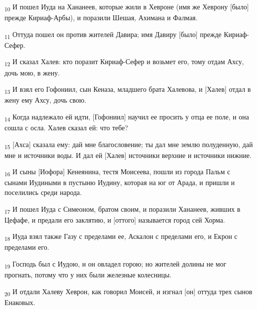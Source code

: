 \begin{tcolorbox}
\textsubscript{10} И пошел Иуда на Хананеев, которые жили в Хевроне (имя же Хеврону [было] прежде Кириаф-Арбы), и поразили Шешая, Ахимана и Фалмая.
\end{tcolorbox}
\begin{tcolorbox}
\textsubscript{11} Оттуда пошел он против жителей Давира; имя Давиру [было] прежде Кириаф-Сефер.
\end{tcolorbox}
\begin{tcolorbox}
\textsubscript{12} И сказал Халев: кто поразит Кириаф-Сефер и возьмет его, тому отдам Ахсу, дочь мою, в жену.
\end{tcolorbox}
\begin{tcolorbox}
\textsubscript{13} И взял его Гофониил, сын Кеназа, младшего брата Халевова, и [Халев] отдал в жену ему Ахсу, дочь свою.
\end{tcolorbox}
\begin{tcolorbox}
\textsubscript{14} Когда надлежало ей идти, [Гофониил] научил ее просить у отца ее поле, и она сошла с осла. Халев сказал ей: что тебе?
\end{tcolorbox}
\begin{tcolorbox}
\textsubscript{15} [Ахса] сказала ему: дай мне благословение; ты дал мне землю полуденную, дай мне и источники воды. И дал ей [Халев] источники верхние и источники нижние.
\end{tcolorbox}
\begin{tcolorbox}
\textsubscript{16} И сыны [Иофора] Кенеянина, тестя Моисеева, пошли из города Пальм с сынами Иудиными в пустыню Иудину, которая на юг от Арада, и пришли и поселились среди народа.
\end{tcolorbox}
\begin{tcolorbox}
\textsubscript{17} И пошел Иуда с Симеоном, братом своим, и поразили Хананеев, живших в Цефафе, и предали его заклятию, и [оттого] называется город сей Хорма.
\end{tcolorbox}
\begin{tcolorbox}
\textsubscript{18} Иуда взял также Газу с пределами ее, Аскалон с пределами его, и Екрон с пределами его.
\end{tcolorbox}
\begin{tcolorbox}
\textsubscript{19} Господь был с Иудою, и он овладел горою; но жителей долины не мог прогнать, потому что у них были железные колесницы.
\end{tcolorbox}
\begin{tcolorbox}
\textsubscript{20} И отдали Халеву Хеврон, как говорил Моисей, и изгнал [он] оттуда трех сынов Енаковых.
\end{tcolorbox}
